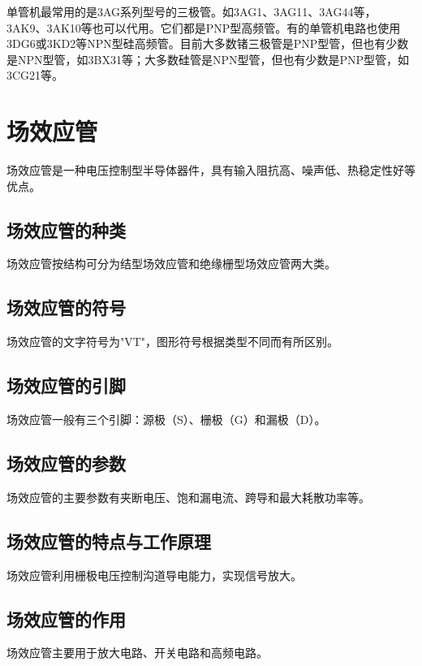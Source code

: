 \documentclass[12pt,UTF8]{ctexbook}
\begin{document}
单管机最常用的是3AG系列型号的三极管。如3AG1、3AG11、3AG44等，3AK9、3AK10等也可以代用。它们都是PNP型高频管。有的单管机电路也使用3DG6或3KD2等NPN型硅高频管。目前大多数锗三极管是PNP型管，但也有少数是NPN型管，如3BX31等；大多数硅管是NPN型管，但也有少数是PNP型管，如3CG21等。

\section{场效应管}

场效应管是一种电压控制型半导体器件，具有输入阻抗高、噪声低、热稳定性好等优点。

\subsection{场效应管的种类}

场效应管按结构可分为结型场效应管和绝缘栅型场效应管两大类。

\subsection{场效应管的符号}

场效应管的文字符号为"VT"，图形符号根据类型不同而有所区别。

\subsection{场效应管的引脚}

场效应管一般有三个引脚：源极（S）、栅极（G）和漏极（D）。

\subsection{场效应管的参数}

场效应管的主要参数有夹断电压、饱和漏电流、跨导和最大耗散功率等。

\subsection{场效应管的特点与工作原理}

场效应管利用栅极电压控制沟道导电能力，实现信号放大。

\subsection{场效应管的作用}

场效应管主要用于放大电路、开关电路和高频电路。
\end{document}
